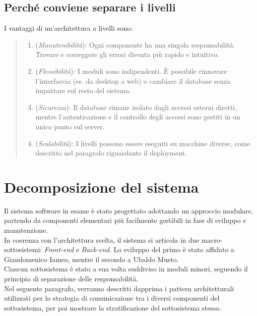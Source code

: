 \subsection{Perché conviene separare i livelli}
I vantaggi di un'architettura a livelli sono:

\begin{quote}
\begin{enumerate}[label=\textit{\arabic*}]
   \item (\textit{Manutenibilità}): Ogni componente ha una singola responsabilità. Trovare e correggere gli errori diventa più rapido e intuitivo.
  
  \item (\textit{Flessibilità}): I moduli sono indipendenti. È possibile rinnovare l'interfaccia (es. da desktop a web) o cambiare il database senza impattare sul resto del sistema.

  \item (\textit{Sicurezza}): Il database rimane isolato dagli accessi esterni diretti, mentre l'autenticazione e il controllo degli accessi sono gestiti in un unico punto sul server. 
  
  \item (\textit{Scalabilità}): I livelli possono essere eseguiti 
  su macchine diverse, come descritto nel paragrafo riguardante il deployment.
\end{enumerate} 
\end{quote}

\section{Decomposizione del sistema}
Il sistema software in esame è stato progettato adottando un approccio modulare, partendo da componenti elementari più facilmente gestibili in fase di sviluppo e manutenzione. \\
\indent In coerenza con l'architettura scelta, il sistema si articola in due macro-sottosistemi: \textit{Front-end} e \textit{Back-end}. Lo sviluppo del primo è stato affidato a Giandomenico Iameo, mentre il secondo a Ubaldo Musto. \\
\indent Ciascun sottosistema è stato a sua volta suddiviso in moduli minori, seguendo il principio di separazione delle responsabilità. \\
\indent Nel seguente paragrafo, verranno descritti dapprima i pattern architetturali utilizzati per la strategia di comunicazione tra i diversi componenti del sottosistema, per poi mostrare la stratificazione del sottosistema stesso.

